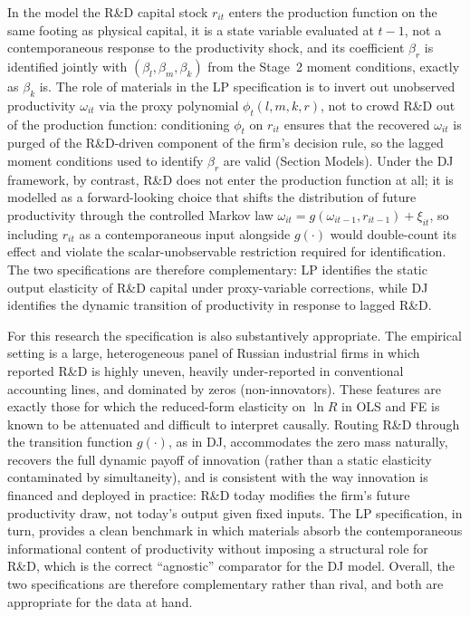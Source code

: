 \documentclass[a4paper, 12pt]{article}
\begin{document}
In the \textcite{levinsohn2003estimating} model the R\&D capital stock $r_{it}$ enters the production function on the same footing as physical capital, it is a state variable evaluated at $t-1$, not a contemporaneous response to the productivity shock, and its coefficient $\beta_r$ is identified jointly with $(\beta_l, \beta_m, \beta_k)$ from the Stage~2 moment conditions, exactly as $\beta_k$ is. The role of materials in the LP specification is to invert out unobserved productivity $\omega_{it}$ via the proxy polynomial $\phi_t(l, m, k, r)$, not to crowd R\&D out of the production function: conditioning $\phi_t$ on $r_{it}$ ensures that the recovered $\omega_{it}$ is purged of the R\&D-driven component of the firm's decision rule, so the lagged moment conditions used to identify $\beta_r$ are valid (Section Models). Under the DJ framework, by contrast, R\&D does not enter the production function at all; it is modelled as a forward-looking choice that shifts the distribution of future productivity through the controlled Markov law $\omega_{it} = g(\omega_{it-1}, r_{it-1}) + \xi_{it}$, so including $r_{it}$ as a contemporaneous input alongside $g(\cdot)$ would double-count its effect and violate the scalar-unobservable restriction required for identification. The two specifications are therefore complementary: LP identifies the static output elasticity of R\&D capital under proxy-variable corrections, while DJ identifies the dynamic transition of productivity in response to lagged R\&D.

For this research the specification is also substantively appropriate. The empirical setting is a large, heterogeneous panel of Russian industrial firms in which reported R\&D is highly uneven, heavily under-reported in conventional accounting lines, and dominated by zeros (non-innovators). These features are exactly those for which the reduced-form elasticity on $\ln R$ in OLS and FE is known to be attenuated and difficult to interpret causally. Routing R\&D through the transition function $g(\cdot)$, as in DJ, accommodates the zero mass naturally, recovers the full dynamic payoff of innovation (rather than a static elasticity contaminated by simultaneity), and is consistent with the way innovation is financed and deployed in practice: R\&D today modifies the firm's future productivity draw, not today's output given fixed inputs. The LP specification, in turn, provides a clean benchmark in which materials absorb the contemporaneous informational content of productivity without imposing a structural role for R\&D, which is the correct ``agnostic'' comparator for the DJ model. Overall, the two specifications are therefore complementary rather than rival, and both are appropriate for the data at hand.
\end{document}
